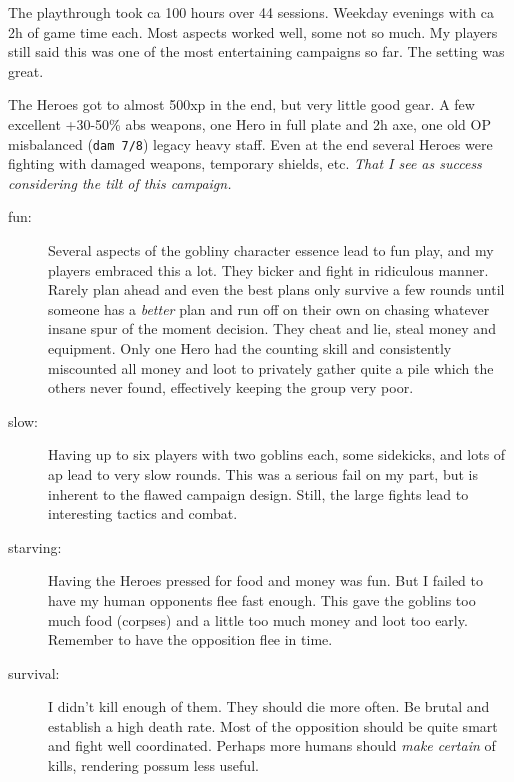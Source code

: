 \noindent The playthrough took ca 100 hours over 44 sessions. Weekday evenings with ca 2h of game time each. 
Most aspects worked well, some not so much. My players still said this was one of the most entertaining campaigns so far. The setting was great.

The Heroes got to almost 500xp in the end, but very little good gear. A few excellent +30-50\% abs weapons, one Hero in full plate and 2h axe, one old OP misbalanced (\texttt{dam 7/8}) legacy heavy staff. Even at the end several Heroes were fighting with damaged weapons, temporary shields, etc. \emph{That I see as success considering the tilt of this campaign.}

\begin{description}

    \item[fun:] Several aspects of the gobliny character essence lead to fun play, and my players embraced this a lot. They bicker and fight in ridiculous manner. Rarely plan ahead and even the best plans only survive a few rounds until someone has a \emph{better} plan and run off on their own on chasing whatever insane spur of the moment decision. They cheat and lie, steal money and equipment. Only one Hero had the counting skill and consistently miscounted all money and loot to privately gather quite a pile which the others never found, effectively keeping the group very poor.

    \item[slow:] Having up to six players with two goblins each, some sidekicks, and lots of ap lead to very slow rounds. This was a serious fail on my part, but is inherent to the flawed campaign design. Still, the large fights lead to interesting tactics and combat.

    \item[starving:] Having the Heroes pressed for food and money was fun. But I failed to have my human opponents flee fast enough. This gave the goblins too much food (corpses) and a little too much money and loot too early. Remember to have the opposition flee in time.

    \item[survival:] I didn't kill enough of them. They should die more often. Be brutal and establish a high death rate. Most of the opposition should be quite smart and fight well coordinated. Perhaps more humans should \emph{make certain} of kills, rendering possum less useful.


\end{description}
